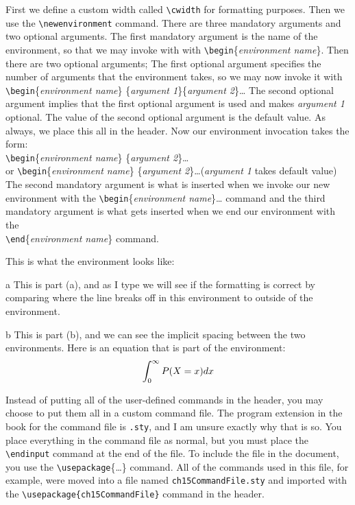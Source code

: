 \documentclass{amsart}
\begin{document}
	First we define a custom width called \verb+\cwidth+ for formatting
	purposes.
	Then we use the \verb+\newenvironment+ command.
	There are three mandatory arguments and two optional arguments.
	The first mandatory argument is the name of the environment, so that
	we may invoke with with \verb+\begin+\{\emph{environment name}\}. 
	Then there are two optional arguments;
	The first optional argument specifies the number of arguments
	that the environment takes, so we may now invoke it with 
	\verb+\begin+\{\emph{environment name}\}
		\!\!\{\emph{argument 1}\}\{\emph{argument 2}\}\dots
	The second optional argument implies that the first optional 
	argument is used and makes \emph{argument 1} optional. 
	The value of the second optional argument is the default value.
	As always, we place this all in the header.
	Now our environment invocation takes the form: \\
	\verb+\begin+\{\emph{environment name}\}
		\!\{\emph{argument 2}\}\dots\\ or
	\verb+\begin+\{\emph{environment name}\}
		\!\!\{\emph{argument 2}\}\dots (\emph{argument 1} takes default value)\\
	The second mandatory argument is what is inserted when we invoke
	our new environment with the \verb+\begin+\{\emph{environment name}\}\dots
	command and the third mandatory argument is what gets inserted when we
	end our environment with the \\ 
	\verb+\end+\{\emph{environment name}\} command. 
	
	This is what the environment looks like:
	\begin{cpart}{a}
		This is part (a), and as I type we will see if the formatting is correct
		by comparing where the line breaks off in this environment to outside
		of the environment. 
	\end{cpart}
	\begin{cpart}{b}
		This is part (b), and we can see the implicit spacing between the
		two environments. Here is an equation that is part of the environment:
		\[
			\int_0^{\infty} P(X = x) dx
		\]
	\end{cpart}
	
	Instead of putting all of the user-defined commands in the header,
	you may choose to put them all in a custom command file.
	The program extension in the book for the command file is 
	\verb+.sty+, and I am unsure exactly why that is so. 
	You place everything in the command file as normal, but you
	must place the \verb+\endinput+ command at the end of the file.
	To include the file in the document, you use the 
	\verb+\usepackage+\{\dots\} command. 
	All of the commands used in this file, for example, 
	were moved into a file named \verb+ch15CommandFile.sty+ and 
	imported with the \verb+\usepackage{ch15CommandFile}+ command in the
	header.
\end{document}
